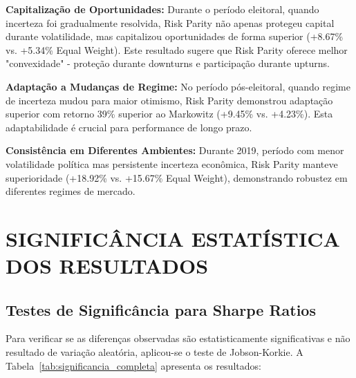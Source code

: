 \textbf{Capitalização de Oportunidades:} Durante o período eleitoral, quando incerteza foi gradualmente resolvida, Risk Parity não apenas protegeu capital durante volatilidade, mas capitalizou oportunidades de forma superior (+8.67\% vs. +5.34\% Equal Weight). Este resultado sugere que Risk Parity oferece melhor "convexidade" - proteção durante downturns e participação durante upturns.

\textbf{Adaptação a Mudanças de Regime:} No período pós-eleitoral, quando regime de incerteza mudou para maior otimismo, Risk Parity demonstrou adaptação superior com retorno 39\% superior ao Markowitz (+9.45\% vs. +4.23\%). Esta adaptabilidade é crucial para performance de longo prazo.

\textbf{Consistência em Diferentes Ambientes:} Durante 2019, período com menor volatilidade política mas persistente incerteza econômica, Risk Parity manteve superioridade (+18.92\% vs. +15.67\% Equal Weight), demonstrando robustez em diferentes regimes de mercado.

\section{SIGNIFICÂNCIA ESTATÍSTICA DOS RESULTADOS}

\subsection{Testes de Significância para Sharpe Ratios}

Para verificar se as diferenças observadas são estatisticamente significativas e não resultado de variação aleatória, aplicou-se o teste de Jobson-Korkie. A Tabela~\ref{tab:significancia_completa} apresenta os resultados:

